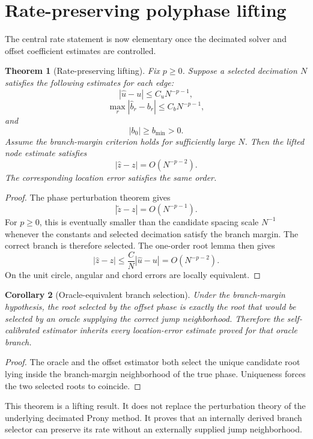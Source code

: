 \documentclass[11pt]{article}
\newtheorem{theorem}{Theorem}[section]
\newtheorem{corollary}[theorem]{Corollary}
\theoremstyle{remark}
\newcommand{\abs}[1]{\left|#1\right|}
\begin{document}
\section{Rate-preserving polyphase lifting}

The central rate statement is now elementary once the decimated solver and offset coefficient estimates are controlled.

\begin{theorem}[Rate-preserving lifting]
Fix $p\ge0$. Suppose a selected decimation $N$ satisfies the following estimates for each edge:
\[
\abs{\widehat u-u}\le C_uN^{-p-1},
\]
\[
\max_r\abs{\widehat b_r-b_r}\le C_bN^{-p-1},
\]
and
\[
\abs{b_0}\ge b_{\min}>0.
\]
Assume the branch-margin criterion holds for sufficiently large $N$. Then the lifted node estimate satisfies
\[
\boxed{
\abs{\widehat z-z}=O(N^{-p-2}).
}
\]
The corresponding location error satisfies the same order.
\end{theorem}

\begin{proof}
The phase perturbation theorem gives
\[
\abs{\widetilde z-z}=O(N^{-p-1}).
\]
For $p\ge0$, this is eventually smaller than the candidate spacing scale $N^{-1}$ whenever the constants and selected decimation satisfy the branch margin. The correct branch is therefore selected. The one-order root lemma then gives
\[
\abs{\widehat z-z}
\le
\frac{C}{N}\abs{\widehat u-u}
=O(N^{-p-2}).
\]
On the unit circle, angular and chord errors are locally equivalent.
\end{proof}

\begin{corollary}[Oracle-equivalent branch selection]
Under the branch-margin hypothesis, the root selected by the offset phase is exactly the root that would be selected by an oracle supplying the correct jump neighborhood. Therefore the self-calibrated estimator inherits every location-error estimate proved for that oracle branch.
\end{corollary}

\begin{proof}
The oracle and the offset estimator both select the unique candidate root lying inside the branch-margin neighborhood of the true phase. Uniqueness forces the two selected roots to coincide.
\end{proof}

This theorem is a lifting result. It does not replace the perturbation theory of the underlying decimated Prony method. It proves that an internally derived branch selector can preserve its rate without an externally supplied jump neighborhood.
\end{document}
